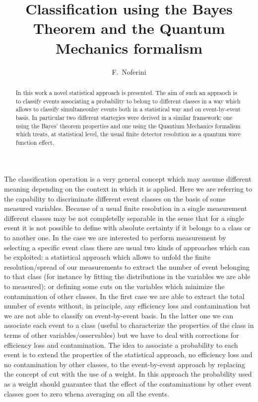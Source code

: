\documentclass{cimento}
\title{Classification using the Bayes Theorem and the Quantum Mechanics formalism}
\author{F.~Noferini\from{ins:centrofermi}\from{ins:infn}}
\begin{document}
\maketitle                            
\begin{abstract}
In this work a novel statistical approach is presented.
The aim of such an appraoch is to classify events associating a probability to belong to different classes in a way
which allows to classify simultaneoulsy events both in a statistical way and on event-by-event basis.
In particular two different startegies were derived in a similar framework: one using the Bayes' theorem properties
and one using the Quantium Mechanics formalism which treats, at statistical level, the usual finite detector resolution as a quantum
wave function effect.
\end{abstract}

\tableofcontents{}


The classification operation is a very general concept which may assume different meaning depending on the context in which
it is applied.
Here we are referring to the capability to discriminate different event classes on the basis of some
measured variables.
Because of a usual finite resolution in a single measurement different classes may be not completelly separable
in the sense that for a single event it is not possible to define with absolute certainty if it belongs to a class
or to another one.
In the case we are interested to perform measurement by selecting a specific event class there are usual two kinds of
approaches which can be exploited: a statistical approach which allows to unfold the finite resolution/spread of our
measurements to extract the number of event belonging to that class (for instance by fitting the distributions in the
variables we are able to measured); or defining some cuts on the variables which minimize the contamination of other classes.
In the first case we are able to extract the total number of events without, in principle, any efficiency loss and
contamination but we are not able to classify on event-by-event basis.
In the latter one we can associate each event to a class (useful to characterize the properties of the class in terms of
other variables/osservables) but we have to deal with corrections for efficiency loss and contamination.
The idea to associate a probability to each event is to extend the properties of the statistical approach, no
efficiency loss and no contamination by other classes, to the event-by-event approach by replacing the concept
of cut with the use of a  weight.
In this approach the probability used as a weight should guarantee that the effect of the contaminations by other
event classes goes to zero whena averaging on all the events.
\end{document}
